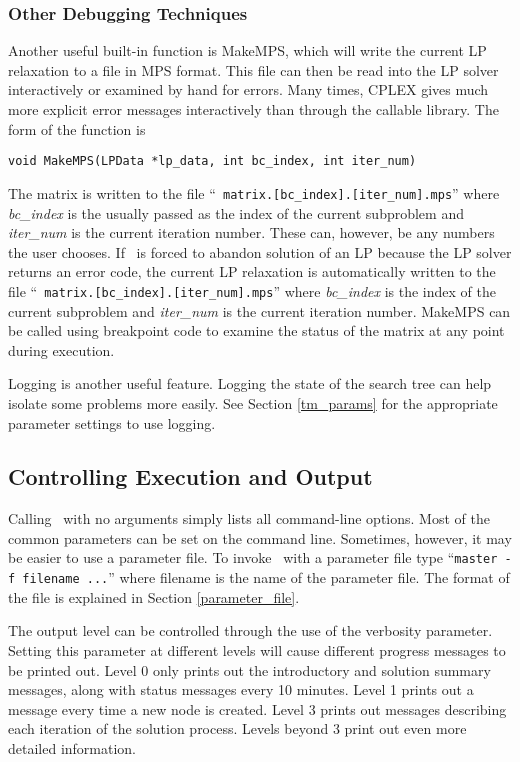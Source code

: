 \subsubsection{Other Debugging Techniques}

Another useful built-in function is MakeMPS, which will write the
current LP relaxation to a file in MPS format. This file can then be
read into the LP solver interactively or examined by hand for errors.
Many times, CPLEX gives much more explicit error messages
interactively than through the callable library. The form of the
function is 
\begin{verbatim}
void MakeMPS(LPData *lp_data, int bc_index, int iter_num)
\end{verbatim}
The matrix is written to the file ``{\tt
matrix.[bc\_index].[iter\_num].mps}'' where {\em bc\_index} is the
usually passed as the index of the current subproblem and {\em
iter\_num} is the current iteration number. These can, however, be any
numbers the user chooses. If \BB\ is forced to abandon solution
of an LP because the LP solver returns an error code, the current LP
relaxation is automatically written to the file ``{\tt
matrix.[bc\_index].[iter\_num].mps}'' where {\em bc\_index} is the
index of the current subproblem and {\em iter\_num} is the current
iteration number. MakeMPS can be called using breakpoint code to
examine the status of the matrix at any point during execution.

Logging is another useful feature. Logging the state of the search tree can
help isolate some problems more easily. See Section \ref{tm_params}
for the appropriate parameter settings to use logging.

\subsection{Controlling Execution and Output}
\label{output}
Calling \BB\ with no arguments simply lists all command-line options.  Most of
the common parameters can be set on the command line. Sometimes, however, it
may be easier to use a parameter file. To invoke \BB\ with a parameter file
type ``{\tt master -f filename ...}'' where filename is the name of the
parameter file. The format of the file is explained in Section
\ref{parameter_file}. 

The output level can be controlled through the use of the verbosity
parameter. Setting this parameter at different levels will cause
different progress messages to be printed out. Level 0 only prints out
the introductory and solution summary messages, along with status
messages every 10 minutes. Level 1 prints out a message every time a
new node is created. Level 3 prints out messages describing each
iteration of the solution process. Levels beyond 3 print out even more
detailed information.

